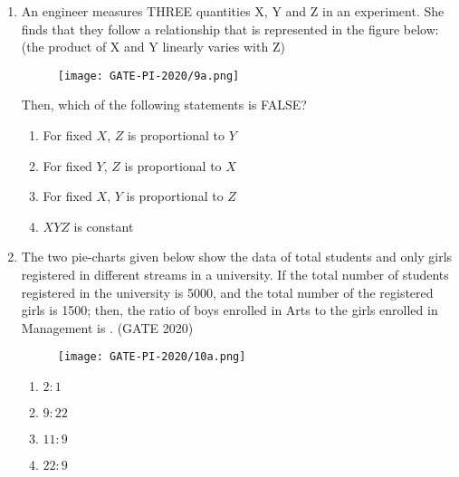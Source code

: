 \documentclass[journal,12pt,onecolumn]{IEEEtran}
\theoremstyle{remark}
\begin{document}
\begin{enumerate}
\item An engineer measures THREE quantities X, Y and Z in an experiment. She finds that they follow a relationship that is represented in the figure below: (the product of X and Y linearly varies with Z)

\begin{figure}[H]
    \centering
   
    \texttt{[image: GATE-PI-2020/9a.png]}
    \caption{}
    \label{q9a}
\end{figure}

Then, which of the following statements is FALSE?
\begin{enumerate}
    \item For fixed $X$, $Z$ is proportional to $Y$
    \item For fixed $Y$, $Z$ is proportional to $X$
    \item For fixed $X$, $Y$ is proportional to $Z$
    \item $XYZ$ is constant
\end{enumerate}
\vspace{1cm}
\item The two pie-charts given below show the data of total students and only girls registered in different streams in a university. If the total number of students registered in the university is 5000, and the total number of the registered girls is 1500; then, the ratio of boys enrolled in Arts to the girls enrolled in Management is \underline{\hspace{1.5cm}}.
\hfill{(GATE 2020)}

\begin{figure}[H]
    \centering
    \texttt{[image: GATE-PI-2020/10a.png]} 
   
  
\end{figure}

\begin{multicols}{4}
\begin{enumerate}
    \item $2:1$
    \item $9:22$
    \item $11:9$
    \item $22:9$
\end{enumerate}
\end{multicols}
\vspace{1cm}
\end{enumerate}
\end{document}
